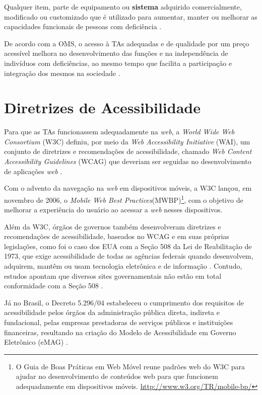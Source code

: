 \begin{citacao}
    Qualquer item, parte de equipamento ou \textbf{sistema} adquirido comercialmente, modificado ou customizado que é utilizado para aumentar, manter ou melhorar as capacidades
    funcionais de pessoas com deficiência \cite{Cook2014}.
\end{citacao}

De acordo com a OMS, o acesso à TAs adequadas e de qualidade por um preço acessível melhora
no desenvolvimento das funções e na independência de indivíduos com deficiências, ao mesmo tempo que facilita
a participação e integração dos mesmos na sociedade \cite{world2019global}.

\section{Diretrizes de Acessibilidade}

Para que as TAs funcionassem adequadamente na \emph{web}, a \textit{World Wide Web Consortium} (W3C) definiu, por meio da
\emph{Web Accessibility Initiative} (WAI), um conjunto de diretrizes e recomendações de acessibilidade, chamado
\emph{Web Content Accessibility Guidelines} (WCAG) que deveriam ser seguidas no desenvolvimento de aplicações \emph{web}
\cite{W3C2019}.

Com o advento da navegação na \emph{web} em dispositivos móveis, a W3C lançou, em novembro
de 2006, o \emph{Mobile Web Best Practices}(MWBP)\footnote{O Guia de Boas Práticas
em Web Móvel reune padrões web do W3C para ajudar no desenvolvimento de conteúdos web para
que funcionem adequadamente em dispositivos móveis. \url{http://www.w3.org/TR/mobile-bp/}}, com o objetivo de
melhorar a experiência do usuário ao acessar a \emph{web} nesses dispositivos.

Além da W3C, órgãos de governos também desenvolveram diretrizes e recomendações de acessibilidade, baseados no WCAG e
em suas próprias legislações, como foi o caso dos EUA com a Seção 508
da Lei de Reabilitação de 1973, que exige acessibilidade de todas as agências federais quando desenvolvem,
adquirem, mantêm ou usam tecnologia eletrônica e de informação \cite{JAEGER2006169}. Contudo, estudos apontam que diversos
sites governamentais não estão em total conformidade com a Seção 508 \cite{KING2016715,YI201575}.

Já no Brasil, o Decreto 5.296/04 estabeleceu o cumprimento dos requisitos de acessibilidade pelos
órgãos da administração pública direta, indireta e fundacional, pelas empresas prestadoras de
serviços públicos e instituições financeiras, resultando na criação do Modelo de Acessibilidade
em Governo Eletrônico (eMAG) \cite{EMAG_2007}.

